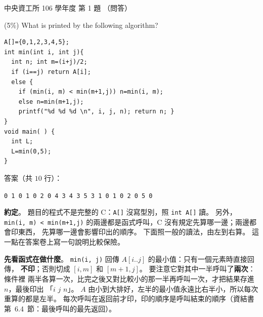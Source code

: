 \begin{pastexam}[label={px:ncu-106-dsa-01}]{中央資工所 106 學年度 第 1 題}
（問答）

(5\%) What is printed by the following algorithm?
\begin{verbatim}
A[]={0,1,2,3,4,5};
int min(int i, int j){
  int n; int m=(i+j)/2;
  if (i==j) return A[i];
  else {
    if (min(i, m) < min(m+1,j)) n=min(i, m);
    else n=min(m+1,j);
    printf("%d %d %d \n", i, j, n); return n; }
}
void main( ) {
  int L;
  L=min(0,5);
}
\end{verbatim}
\end{pastexam}

\begin{pastsoln}
答案（共 $10$ 行）：
\begin{center}
\texttt{0 1 0 1 0 2 0 4 3 4 3 5 3 1 0 1 0 2 0 5 0}
\end{center}

\textbf{約定}。 題目的程式不是完整的 C：\texttt{A[]} 沒寫型別，照 \texttt{int A[]} 讀。 另外，
\texttt{min(i, m) < min(m+1,j)} 的兩邊都是函式呼叫，C 沒有規定先算哪一邊；兩邊都會印東西，
先算哪一邊會影響印出的順序。 下面照一般的讀法，由左到右算。 這一點在答案卷上寫一句說明比較保險。

\textbf{先看函式在做什麼}。 \texttt{min(i, j)} 回傳 $A[i..j]$ 的最小值：只有一個元素時直接回傳，
\textbf{不印}；否則切成 $[i, m]$ 和 $[m+1, j]$。 要注意它對其中一半呼叫了\textbf{兩次}：條件裡
兩半各算一次，比完之後又對比較小的那一半再呼叫一次，才把結果存進 $n$，最後印出
「$i$ $j$ $n$」。 $A$ 由小到大排好，左半的最小值永遠比右半小，所以每次重算的都是左半。
每次呼叫在返回前才印，印的順序是呼叫結束的順序（資結書第~6.4~節：最後呼叫的最先返回）。


\end{pastsoln}
